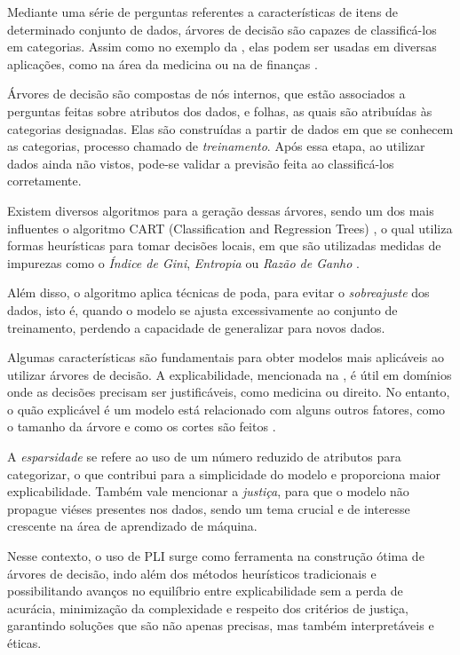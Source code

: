 \documentclass[12pt,a4paper]{article}
\begin{document}
Mediante uma série de perguntas referentes a características de itens de determinado conjunto de dados, árvores de decisão são capazes de classificá-los em categorias. Assim como no exemplo da , elas podem ser usadas em diversas aplicações, como na área da medicina \cite{Richards2001, Freitas2014} ou na de finanças \cite{Dhar2000}.

Árvores de decisão são compostas de nós internos, que estão associados a perguntas feitas sobre atributos dos dados, e folhas, as quais são atribuídas às categorias designadas. Elas são construídas a partir de dados em que se conhecem as categorias, processo chamado de \textit{treinamento}. Após essa etapa, ao utilizar dados ainda não vistos, pode-se validar a previsão feita ao classificá-los corretamente.

Existem diversos algoritmos para a geração dessas árvores, sendo um dos mais influentes o algoritmo CART (Classification and Regression Trees) \cite{breiman1984classification}, o qual utiliza formas heurísticas para tomar decisões locais, em que são utilizadas medidas de impurezas como o \textit{Índice de Gini}, \textit{Entropia} ou \textit{Razão de Ganho} \cite{Kotsiantis13}.

Além disso, o algoritmo aplica técnicas de poda, para evitar o \textit{sobreajuste} dos dados, isto é, quando o modelo se ajusta excessivamente ao conjunto de treinamento, perdendo a capacidade de generalizar para novos dados.

Algumas características são fundamentais para obter modelos mais aplicáveis ao utilizar árvores de decisão. A explicabilidade, mencionada na , é útil em domínios onde as decisões precisam ser justificáveis, como medicina ou direito. No entanto, o quão explicável é um modelo está relacionado com alguns outros fatores, como o tamanho da árvore e como os cortes são feitos \cite{Costa22}. 

A \emph{esparsidade} se refere ao uso de um número reduzido de atributos para categorizar, o que contribui para a simplicidade do modelo e proporciona maior explicabilidade. Também vale mencionar a \emph{justiça}, para que o modelo não propague viéses presentes nos dados, sendo um tema crucial e de interesse crescente na área de aprendizado de máquina.

Nesse contexto, o uso de PLI surge como ferramenta na construção ótima de árvores de decisão, indo além dos métodos heurísticos tradicionais e possibilitando avanços no equilíbrio entre explicabilidade sem a perda de acurácia, minimização da complexidade e respeito dos critérios de justiça, garantindo soluções que são não apenas precisas, mas também interpretáveis e éticas.
\end{document}
